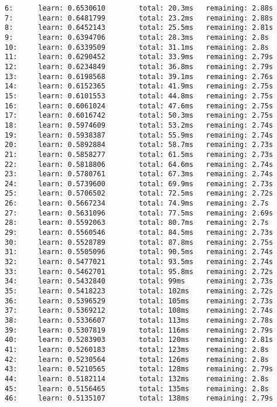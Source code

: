 \documentclass[11pt]{article}
\begin{document}
\begin{Verbatim}[commandchars=\\\{\}]
6:      learn: 0.6530610        total: 20.3ms   remaining: 2.88s
7:      learn: 0.6481799        total: 23.2ms   remaining: 2.88s
8:      learn: 0.6452143        total: 25.5ms   remaining: 2.81s
9:      learn: 0.6394706        total: 28.3ms   remaining: 2.8s
10:     learn: 0.6339509        total: 31.1ms   remaining: 2.8s
11:     learn: 0.6290452        total: 33.9ms   remaining: 2.79s
12:     learn: 0.6234849        total: 36.8ms   remaining: 2.79s
13:     learn: 0.6198568        total: 39.1ms   remaining: 2.76s
14:     learn: 0.6152365        total: 41.9ms   remaining: 2.75s
15:     learn: 0.6101553        total: 44.8ms   remaining: 2.75s
16:     learn: 0.6061024        total: 47.6ms   remaining: 2.75s
17:     learn: 0.6016742        total: 50.3ms   remaining: 2.75s
18:     learn: 0.5974609        total: 53.2ms   remaining: 2.74s
19:     learn: 0.5938387        total: 55.9ms   remaining: 2.74s
20:     learn: 0.5892884        total: 58.7ms   remaining: 2.73s
21:     learn: 0.5858277        total: 61.5ms   remaining: 2.73s
22:     learn: 0.5818806        total: 64.6ms   remaining: 2.74s
23:     learn: 0.5780761        total: 67.3ms   remaining: 2.74s
24:     learn: 0.5739600        total: 69.9ms   remaining: 2.73s
25:     learn: 0.5706502        total: 72.5ms   remaining: 2.72s
26:     learn: 0.5667234        total: 74.9ms   remaining: 2.7s
27:     learn: 0.5631096        total: 77.5ms   remaining: 2.69s
28:     learn: 0.5592063        total: 80.7ms   remaining: 2.7s
29:     learn: 0.5560546        total: 84.5ms   remaining: 2.73s
30:     learn: 0.5528789        total: 87.8ms   remaining: 2.75s
31:     learn: 0.5505096        total: 90.5ms   remaining: 2.74s
32:     learn: 0.5477021        total: 93.5ms   remaining: 2.74s
33:     learn: 0.5462701        total: 95.8ms   remaining: 2.72s
34:     learn: 0.5432840        total: 99ms     remaining: 2.73s
35:     learn: 0.5418223        total: 102ms    remaining: 2.72s
36:     learn: 0.5396529        total: 105ms    remaining: 2.73s
37:     learn: 0.5369212        total: 108ms    remaining: 2.74s
38:     learn: 0.5336607        total: 113ms    remaining: 2.78s
39:     learn: 0.5307819        total: 116ms    remaining: 2.79s
40:     learn: 0.5283903        total: 120ms    remaining: 2.81s
41:     learn: 0.5260183        total: 123ms    remaining: 2.8s
42:     learn: 0.5230564        total: 126ms    remaining: 2.8s
43:     learn: 0.5210565        total: 128ms    remaining: 2.79s
44:     learn: 0.5182114        total: 132ms    remaining: 2.8s
45:     learn: 0.5156465        total: 135ms    remaining: 2.8s
46:     learn: 0.5135107        total: 138ms    remaining: 2.79s

\end{Verbatim}
\end{document}
